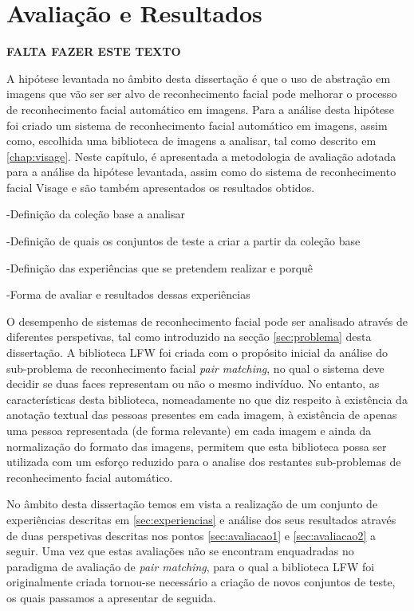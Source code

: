 \chapter{Avaliação e Resultados} \label{chap:resultados}
\textbf{FALTA FAZER ESTE TEXTO}

A hipótese levantada no âmbito desta dissertação é que o uso de abstração em imagens que vão ser ser alvo de reconhecimento facial pode melhorar o processo de reconhecimento facial automático em imagens. Para a análise desta hipótese foi criado um sistema de reconhecimento facial automático em imagens, assim  como, escolhida uma biblioteca de imagens a analisar, tal como descrito em \ref{chap:visage}. Neste capítulo, é apresentada a metodologia de avaliação adotada para a análise da hipótese levantada, assim como do sistema de reconhecimento facial Visage e são também apresentados os resultados obtidos.



-Definição da coleção base a analisar

-Definição de quais os conjuntos de teste a criar a partir da coleção base

-Definição das experiências que se pretendem realizar e porquê

-Forma de avaliar e resultados dessas experiências

O desempenho de sistemas de reconhecimento facial pode ser analisado através de diferentes perspetivas, tal como introduzido na secção \ref{sec:problema} desta dissertação. A biblioteca LFW foi criada com o propósito inicial da análise do sub-problema de reconhecimento facial \textit{pair matching}, no qual o sistema deve decidir se duas faces representam ou não o mesmo indivíduo. No entanto, as características desta biblioteca, nomeadamente no que diz respeito à existência da anotação textual das pessoas presentes em cada imagem, à existência de apenas uma pessoa representada (de forma relevante) em cada imagem e ainda da normalização do formato das imagens, permitem que esta biblioteca possa ser utilizada com um esforço reduzido para o analise dos restantes sub-problemas de reconhecimento facial automático.

No âmbito desta dissertação temos em vista a realização de um conjunto de experiências descritas em \ref{sec:experiencias} e análise dos seus resultados através de duas perspetivas descritas nos pontos \ref{sec:avaliacao1} e \ref{sec:avaliacao2} a seguir. Uma vez que estas avaliações não se encontram enquadradas no paradigma de avaliação de \textit{pair matching}, para o qual a biblioteca LFW foi originalmente criada tornou-se necessário a criação de novos conjuntos de teste, os quais passamos a apresentar de seguida.


